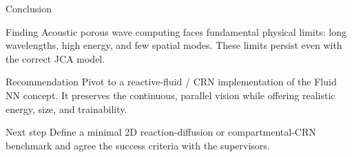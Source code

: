 \documentclass[aspectratio=169,11pt]{beamer}
\begin{document}
\begin{frame}{Conclusion}
  \small
  \begin{block}{Finding}
    Acoustic porous wave computing faces fundamental physical limits: long wavelengths, high energy, and few spatial modes. These limits persist even with the correct JCA model.
  \end{block}

  \vspace{0.2cm}
  \begin{block}{Recommendation}
    Pivot to a reactive-fluid / CRN implementation of the Fluid NN concept. It preserves the continuous, parallel vision while offering realistic energy, size, and trainability.
  \end{block}

  \vspace{0.2cm}
  \begin{block}{Next step}
    Define a minimal 2D reaction-diffusion or compartmental-CRN benchmark and agree the success criteria with the supervisors.
  \end{block}
\end{frame}
\end{document}
